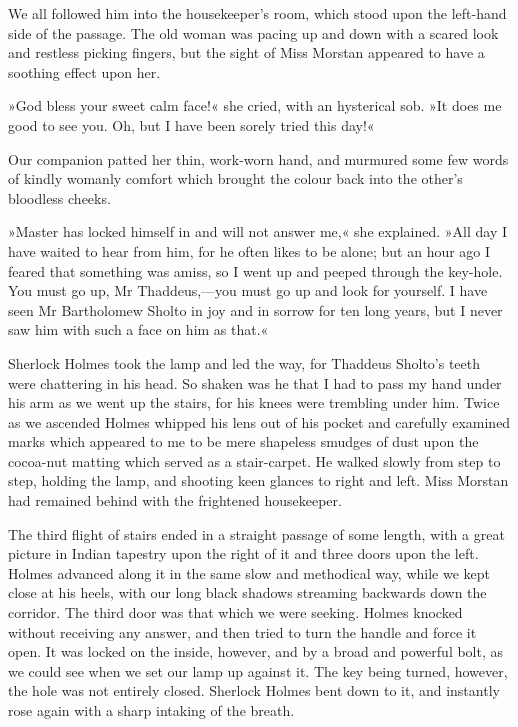 We all followed him into the housekeeper's room, which stood upon the left-hand side of the passage. The old woman was pacing up and down with a scared look and restless picking fingers, but the sight of Miss Morstan appeared to have a soothing effect upon her.

»God bless your sweet calm face!« she cried, with an hysterical sob. »It does me good to see you. Oh, but I have been sorely tried this day!«

Our companion patted her thin, work-worn hand, and murmured some few words of kindly womanly comfort which brought the colour back into the other's bloodless cheeks.

»Master has locked himself in and will not answer me,« she explained. »All day I have waited to hear from him, for he often likes to be alone; but an hour ago I feared that something was amiss, so I went up and peeped through the key-hole. You must go up, Mr Thaddeus,—you must go up and look for yourself. I have seen Mr Bartholomew Sholto in joy and in sorrow for ten long years, but I never saw him with such a face on him as that.«

Sherlock Holmes took the lamp and led the way, for Thaddeus Sholto's teeth were chattering in his head. So shaken was he that I had to pass my hand under his arm as we went up the stairs, for his knees were trembling under him. Twice as we ascended Holmes whipped his lens out of his pocket and carefully examined marks which appeared to me to be mere shapeless smudges of dust upon the cocoa-nut matting which served as a stair-carpet. He walked slowly from step to step, holding the lamp, and shooting keen glances to right and left. Miss Morstan had remained behind with the frightened housekeeper.

The third flight of stairs ended in a straight passage of some length, with a great picture in Indian tapestry upon the right of it and three doors upon the left. Holmes advanced along it in the same slow and methodical way, while we kept close at his heels, with our long black shadows streaming backwards down the corridor. The third door was that which we were seeking. Holmes knocked without receiving any answer, and then tried to turn the handle and force it open. It was locked on the inside, however, and by a broad and powerful bolt, as we could see when we set our lamp up against it. The key being turned, however, the hole was not entirely closed. Sherlock Holmes bent down to it, and instantly rose again with a sharp intaking of the breath.

